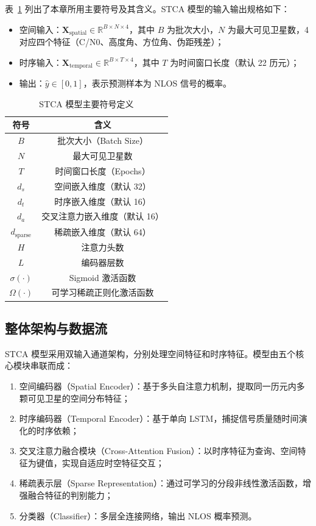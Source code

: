     表~\ref{tab:symbols} 列出了本章所用主要符号及其含义。STCA 模型的输入输出规格如下：

    \begin{itemize}
        \item 空间输入：$\bm{X}_{\text{spatial}} \in \mathbb{R}^{B \times N \times 4}$，其中 $B$ 为批次大小，$N$ 为最大可见卫星数，4 对应四个特征（C/N0、高度角、方位角、伪距残差）；
        \item 时序输入：$\bm{X}_{\text{temporal}} \in \mathbb{R}^{B \times T \times 4}$，其中 $T$ 为时间窗口长度（默认 22 历元）；
        \item 输出：$\hat{y} \in [0, 1]$，表示预测样本为 NLOS 信号的概率。
    \end{itemize}

    \begin{table}[htbp]
    \centering
    \caption{STCA 模型主要符号定义}
    \label{tab:symbols}
    \begin{tabular}{cc}
    \toprule
    \textbf{符号} & \textbf{含义} \\
    \midrule
    $B$ & 批次大小（Batch Size） \\
    $N$ & 最大可见卫星数 \\
    $T$ & 时间窗口长度（Epochs） \\
    $d_s$ & 空间嵌入维度（默认 32） \\
    $d_t$ & 时序嵌入维度（默认 16） \\
    $d_a$ & 交叉注意力嵌入维度（默认 16） \\
    $d_{\text{sparse}}$ & 稀疏嵌入维度（默认 64） \\
    $H$ & 注意力头数 \\
    $L$ & 编码器层数 \\
    $\sigma(\cdot)$ & Sigmoid 激活函数 \\
    $\Omega(\cdot)$ & 可学习稀疏正则化激活函数 \\
    \bottomrule
    \end{tabular}
    \end{table}

\subsection{整体架构与数据流}

    STCA 模型采用双输入通道架构，分别处理空间特征和时序特征。模型由五个核心模块串联而成：

    \begin{enumerate}
        \item 空间编码器（Spatial Encoder）：基于多头自注意力机制，提取同一历元内多颗可见卫星的空间分布特征；
        \item 时序编码器（Temporal Encoder）：基于单向 LSTM，捕捉信号质量随时间演化的时序依赖；
        \item 交叉注意力融合模块（Cross-Attention Fusion）：以时序特征为查询、空间特征为键值，实现自适应时空特征交互；
        \item 稀疏表示层（Sparse Representation）：通过可学习的分段非线性激活函数，增强融合特征的判别能力；
        \item 分类器（Classifier）：多层全连接网络，输出 NLOS 概率预测。
    \end{enumerate}

